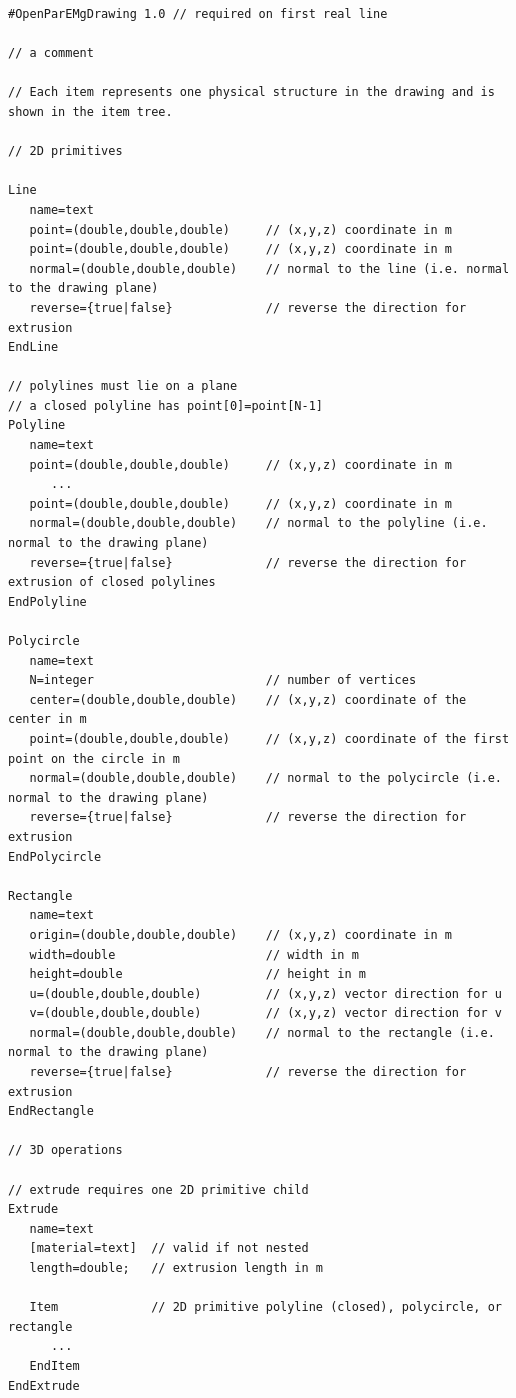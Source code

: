 \documentclass[titlepage]{article}
\renewcommand\_{\textunderscore\linebreak[1]}
\begin{document}
\begin{Verbatim}[fontsize=\small]
#OpenParEMgDrawing 1.0 // required on first real line

// a comment

// Each item represents one physical structure in the drawing and is shown in the item tree.

// 2D primitives

Line
   name=text
   point=(double,double,double)     // (x,y,z) coordinate in m
   point=(double,double,double)     // (x,y,z) coordinate in m
   normal=(double,double,double)    // normal to the line (i.e. normal to the drawing plane)
   reverse={true|false}             // reverse the direction for extrusion
EndLine

// polylines must lie on a plane
// a closed polyline has point[0]=point[N-1]
Polyline
   name=text
   point=(double,double,double)     // (x,y,z) coordinate in m
      ...
   point=(double,double,double)     // (x,y,z) coordinate in m
   normal=(double,double,double)    // normal to the polyline (i.e. normal to the drawing plane)
   reverse={true|false}             // reverse the direction for extrusion of closed polylines
EndPolyline

Polycircle
   name=text
   N=integer                        // number of vertices
   center=(double,double,double)    // (x,y,z) coordinate of the center in m
   point=(double,double,double)     // (x,y,z) coordinate of the first point on the circle in m
   normal=(double,double,double)    // normal to the polycircle (i.e. normal to the drawing plane)
   reverse={true|false}             // reverse the direction for extrusion
EndPolycircle

Rectangle
   name=text
   origin=(double,double,double)    // (x,y,z) coordinate in m
   width=double                     // width in m
   height=double                    // height in m
   u=(double,double,double)         // (x,y,z) vector direction for u
   v=(double,double,double)         // (x,y,z) vector direction for v
   normal=(double,double,double)    // normal to the rectangle (i.e. normal to the drawing plane)
   reverse={true|false}             // reverse the direction for extrusion
EndRectangle

// 3D operations 

// extrude requires one 2D primitive child 
Extrude
   name=text
   [material=text]  // valid if not nested
   length=double;   // extrusion length in m

   Item             // 2D primitive polyline (closed), polycircle, or rectangle
      ...
   EndItem
EndExtrude


\end{Verbatim}
\end{document}
